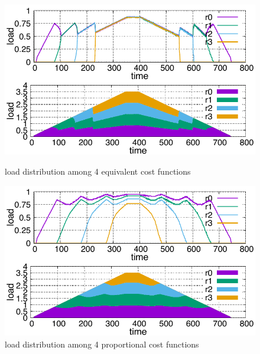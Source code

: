\begin{figure}[tb]
  \begin{minipage}{1.0\columnwidth}
  \begin{center}
    \includegraphics[width=1.0\columnwidth]{4node.pdf}
    \vspace{-2.0ex}
    \caption{load distribution among 4 equivalent cost functions}
    \label{fig:4node}
  \end{center}
  \end{minipage}
  \hspace{0.8\columnsep}
  \begin{minipage}{1.0\columnwidth}
  \begin{center}
    \includegraphics[width=1.0\columnwidth]{4node-ratio.pdf}
    \vspace{-2.0ex}
    \caption{load distribution among 4 proportional cost functions}
    \label{fig:4node-ratio}
  \end{center}
  \end{minipage}
\end{figure}

